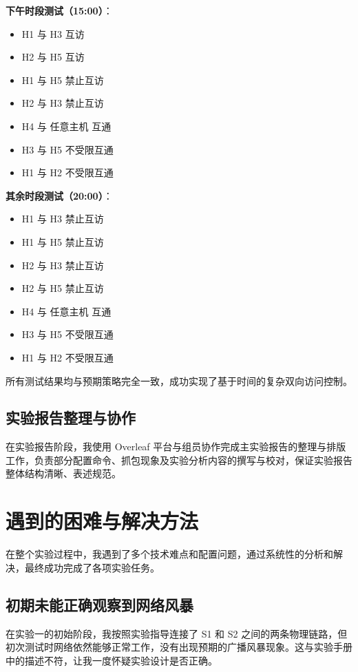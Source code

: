 \documentclass[a4paper]{article}
\begin{document}
\textbf{下午时段测试（15:00）}：
\begin{itemize}
    \item H1 与 H3 互访
    \item H2 与 H5 互访
    \item H1 与 H5 禁止互访
    \item H2 与 H3 禁止互访
    \item H4 与 任意主机 互通
    \item H3 与 H5 不受限互通
    \item H1 与 H2 不受限互通
\end{itemize}

\textbf{其余时段测试（20:00）}：
\begin{itemize}
    \item H1 与 H3 禁止互访
    \item H1 与 H5 禁止互访
    \item H2 与 H3 禁止互访
    \item H2 与 H5 禁止互访
    \item H4 与 任意主机 互通
    \item H3 与 H5 不受限互通
    \item H1 与 H2 不受限互通
\end{itemize}

所有测试结果均与预期策略完全一致，成功实现了基于时间的复杂双向访问控制。

\subsection{实验报告整理与协作}

在实验报告阶段，我使用 Overleaf 平台与组员协作完成主实验报告的整理与排版工作，负责部分配置命令、抓包现象及实验分析内容的撰写与校对，保证实验报告整体结构清晰、表述规范。

\section{遇到的困难与解决方法}

在整个实验过程中，我遇到了多个技术难点和配置问题，通过系统性的分析和解决，最终成功完成了各项实验任务。

\subsection{初期未能正确观察到网络风暴}

在实验一的初始阶段，我按照实验指导连接了 S1 和 S2 之间的两条物理链路，但初次测试时网络依然能够正常工作，没有出现预期的广播风暴现象。这与实验手册中的描述不符，让我一度怀疑实验设计是否正确。
\end{document}
